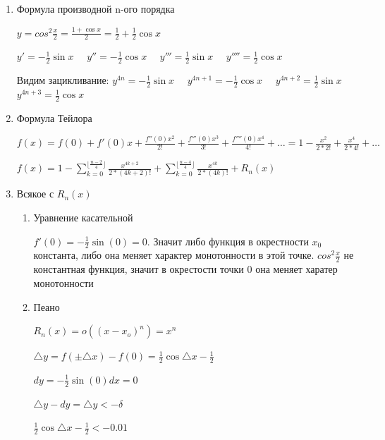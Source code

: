 \begin{enumerate}
    \item Формула производной n-ого порядка

    $\displaystyle y = cos^2 \frac{x}{2} = \frac{1 + \cos x}{2} = \frac{1}{2} + \frac{1}{2} \cos x$

    $y' = \displaystyle -\frac{1}{2} \sin x\quad$
    $y'' = \displaystyle -\frac{1}{2} \cos x\quad$
    $y''' = \displaystyle \frac{1}{2} \sin x\quad$
    $y'''' = \displaystyle \frac{1}{2} \cos x$

    Видим зацикливание:
    $y^{4n} = \displaystyle -\frac{1}{2} \sin x\quad$
    $y^{4n + 1} = \displaystyle -\frac{1}{2} \cos x\quad$
    $y^{4n+2} = \displaystyle \frac{1}{2} \sin x\quad$
    $y^{4n+3} = \displaystyle \frac{1}{2} \cos x$

    \item Формула Тейлора

    $\displaystyle f(x) = f(0) + f'(0)x + \frac{f''(0)x^2}{2!} + \frac{f'''(0)x^3}{3!} + \frac{f''''(0)x^4}{4!} + \dots = 1 - \frac{x^2}{2 * 2!} + \frac{x^4}{2 * 4!} + \dots$

    $\displaystyle f(x) = 1 - \sum_{k=0}^{\lfloor \frac{n - 2}{4} \rfloor}\frac{x^{4k + 2}}{2 * (4k+2)!} + \sum_{k=0}^{\lfloor \frac{n - 4}{4} \rfloor}\frac{x^{4k}}{2 * (4k)!} + R_n(x)$

    \item Всякое с $R_n(x)$

    \begin{enumerate}
        \item Уравнение касательной

        $f'(0) = - \frac{1}{2}\sin(0) = 0$.
        Значит либо функция в окрестности $x_0$ константа, либо она меняет характер монотонности в этой точке. $cos^2 \frac{x}{2}$ не константная функция, значит в окрестости точки 0 она меняет харатер монотонности\\

        \item Пеано

        $\displaystyle  R_n(x) = o((x-x_o)^n) = x^n$

        $\displaystyle  \triangle y = f(\pm \triangle x) - f(0) = \frac{1}{2} \cos \triangle x - \frac{1}{2}$

        $\displaystyle  dy = -\frac{1}{2}\sin(0) dx = 0$

        $\displaystyle  \triangle y - dy = \triangle y < - \delta$

        $\displaystyle \frac{1}{2} \cos \triangle x - \frac{1}{2} < -0.01$


\end{enumerate}
\end{enumerate}
